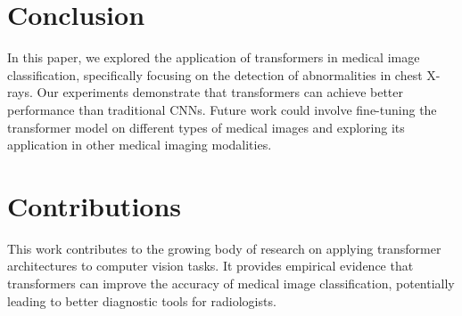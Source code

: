\documentclass{article}
\begin{document}
\section{Conclusion}
In this paper, we explored the application of transformers in medical image classification, specifically focusing on the detection of abnormalities in chest X-rays. Our experiments demonstrate that transformers can achieve better performance than traditional CNNs. Future work could involve fine-tuning the transformer model on different types of medical images and exploring its application in other medical imaging modalities.

\section{Contributions}
This work contributes to the growing body of research on applying transformer architectures to computer vision tasks. It provides empirical evidence that transformers can improve the accuracy of medical image classification, potentially leading to better diagnostic tools for radiologists.
\end{document}

